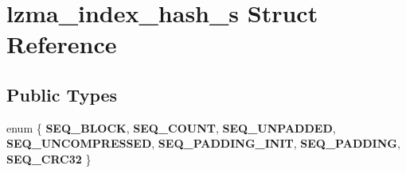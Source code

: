 \section{lzma\+\_\+index\+\_\+hash\+\_\+s Struct Reference}
\label{structlzma__index__hash__s}
\subsection*{Public Types}
\begin{DoxyCompactItemize}
\item 
\mbox{\label{structlzma__index__hash__s_ad642ec3abc35983b5005bfa5dea17d2f}} 
enum \{ \newline
{\bfseries S\+E\+Q\+\_\+\+B\+L\+O\+CK}, 
{\bfseries S\+E\+Q\+\_\+\+C\+O\+U\+NT}, 
{\bfseries S\+E\+Q\+\_\+\+U\+N\+P\+A\+D\+D\+ED}, 
{\bfseries S\+E\+Q\+\_\+\+U\+N\+C\+O\+M\+P\+R\+E\+S\+S\+ED}, 
\newline
{\bfseries S\+E\+Q\+\_\+\+P\+A\+D\+D\+I\+N\+G\+\_\+\+I\+N\+IT}, 
{\bfseries S\+E\+Q\+\_\+\+P\+A\+D\+D\+I\+NG}, 
{\bfseries S\+E\+Q\+\_\+\+C\+R\+C32}
 \}
\end{DoxyCompactItemize}
